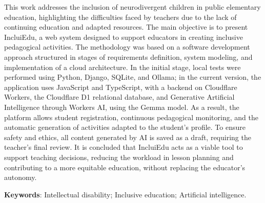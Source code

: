 \begin{ABSTRACT}
	
	This work addresses the inclusion of neurodivergent children in public elementary education, highlighting the difficulties faced by teachers due to the lack of continuing education and adapted resources. The main objective is to present IncluiEdu, a web system designed to support educators in creating inclusive pedagogical activities. The methodology was based on a software development approach structured in stages of requirements definition, system modeling, and implementation of a cloud architecture. In the initial stage, local tests were performed using Python, Django, SQLite, and Ollama; in the current version, the application uses JavaScript and TypeScript, with a backend on Cloudflare Workers, the Cloudflare D1 relational database, and Generative Artificial Intelligence through Workers AI, using the Gemma model. As a result, the platform allows student registration, continuous pedagogical monitoring, and the automatic generation of activities adapted to the student’s profile. To ensure safety and ethics, all content generated by AI is saved as a draft, requiring the teacher’s final review. It is concluded that IncluiEdu acts as a viable tool to support teaching decisions, reducing the workload in lesson planning and contributing to a more equitable education, without replacing the educator’s autonomy.

\vspace*{0.5cm}\noindent\textbf{Keywords}: Intellectual disability; Inclusive education; Artificial intelligence.
		
\end{ABSTRACT}
